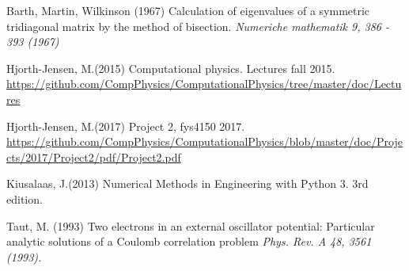 \documentclass{article}
\begin{document}
\pagebreak
\begin{thebibliography}{9}
	Barth, Martin, Wilkinson (1967)
	Calculation of eigenvalues of a symmetric tridiagonal matrix by the method of bisection. \textit{Numeriche mathematik 9, 386 - 393 (1967)}
	
	Hjorth-Jensen, M.(2015)
	Computational physics. Lectures fall 2015. 
	\url{https://github.com/CompPhysics/ComputationalPhysics/tree/master/doc/Lectures}
	
	Hjorth-Jensen, M.(2017)
	Project 2, fys4150 2017.
	\url{https://github.com/CompPhysics/ComputationalPhysics/blob/master/doc/Projects/2017/Project2/pdf/Project2.pdf}
	
	Kiusalaas, J.(2013)
	Numerical Methods in Engineering with Python 3. 3rd edition.
	
	Taut, M. (1993)
	Two electrons in an external oscillator potential: Particular analytic solutions of a Coulomb correlation problem \textit{Phys. Rev. A 48, 3561 (1993).}
	
	


\end{thebibliography}
\end{document}
